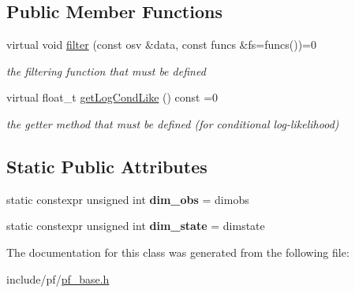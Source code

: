\subsection*{Public Member Functions}
\begin{DoxyCompactItemize}
\item 
\mbox{\label{classpf__base_aec857789031fd938b7088faa3607707a}} 
virtual void \hyperlink{classpf__base_aec857789031fd938b7088faa3607707a}{filter} (const osv \&data, const funcs \&fs=funcs())=0
\begin{DoxyCompactList}\small\item\em the filtering function that must be defined \end{DoxyCompactList}\item 
\mbox{\label{classpf__base_a350df818820d6ab0fd6d413022b7f23b}} 
virtual float\+\_\+t \hyperlink{classpf__base_a350df818820d6ab0fd6d413022b7f23b}{get\+Log\+Cond\+Like} () const =0
\begin{DoxyCompactList}\small\item\em the getter method that must be defined (for conditional log-\/likelihood) \end{DoxyCompactList}\end{DoxyCompactItemize}
\subsection*{Static Public Attributes}
\begin{DoxyCompactItemize}
\item 
\mbox{\label{classpf__base_a6fd0ef79ffb005b72045881875fcacb8}} 
static constexpr unsigned int {\bfseries dim\+\_\+obs} = dimobs
\item 
\mbox{\label{classpf__base_a0a13a058c19940f56d7f30ed5f910f7f}} 
static constexpr unsigned int {\bfseries dim\+\_\+state} = dimstate
\end{DoxyCompactItemize}


The documentation for this class was generated from the following file\+:\begin{DoxyCompactItemize}
\item 
include/pf/\hyperlink{pf__base_8h}{pf\+\_\+base.\+h}\end{DoxyCompactItemize}
